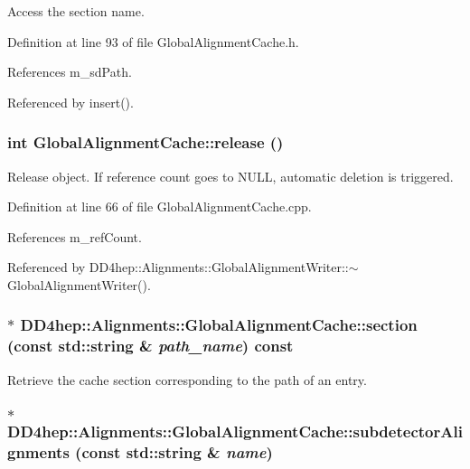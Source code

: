 Access the section name. 

Definition at line 93 of file GlobalAlignmentCache.h.

References m\_\-sdPath.

Referenced by insert().\hypertarget{class_d_d4hep_1_1_alignments_1_1_global_alignment_cache_a7de701232e1c2da3ca981de290805060}{
\subsubsection[{release}]{\setlength{\rightskip}{0pt plus 5cm}int GlobalAlignmentCache::release ()}}
\label{class_d_d4hep_1_1_alignments_1_1_global_alignment_cache_a7de701232e1c2da3ca981de290805060}


Release object. If reference count goes to NULL, automatic deletion is triggered. 

Definition at line 66 of file GlobalAlignmentCache.cpp.

References m\_\-refCount.

Referenced by DD4hep::Alignments::GlobalAlignmentWriter::$\sim$GlobalAlignmentWriter().\hypertarget{class_d_d4hep_1_1_alignments_1_1_global_alignment_cache_a792d4a08dcae4d185fa9a3ab2099aaef}{
\subsubsection[{section}]{$\ast$ DD4hep::Alignments::GlobalAlignmentCache::section (const std::string \& {\em path\_\-name}) const}}
\label{class_d_d4hep_1_1_alignments_1_1_global_alignment_cache_a792d4a08dcae4d185fa9a3ab2099aaef}


Retrieve the cache section corresponding to the path of an entry. \hypertarget{class_d_d4hep_1_1_alignments_1_1_global_alignment_cache_ac38294d179431c5078d6ec42f54893be}{
\subsubsection[{subdetectorAlignments}]{$\ast$ DD4hep::Alignments::GlobalAlignmentCache::subdetectorAlignments (const std::string \& {\em name})}}
\label{class_d_d4hep_1_1_alignments_1_1_global_alignment_cache_ac38294d179431c5078d6ec42f54893be}


